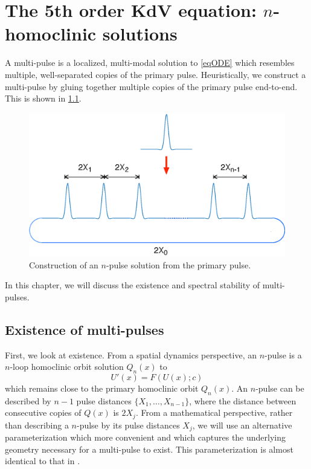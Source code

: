 \documentclass[thesis.tex]{subfiles}
\begin{document}
\iffulldocument\else
	\chapter{The 5th order KdV equation: $n$-homoclinic solutions}
\fi

A multi-pulse is a localized, multi-modal solution to \cref{eqODE} which resembles multiple, well-separated copies of the primary pulse. Heuristically, we construct a multi-pulse by gluing together multiple copies of the primary pulse end-to-end. This is shown in \cref{fig:multipulse}.
\begin{figure}
\begin{center}
\includegraphics[width=12cm]{images/kdv5numerics/multipulseperiodic.eps}
\end{center}
\caption[Construction of an $n$-pulse solution]{Construction of an $n$-pulse solution from the primary pulse.}
\label{fig:multipulse}
\end{figure}
In this chapter, we will discuss the existence and spectral stability of multi-pulses.

\section{Existence of multi-pulses}\label{sec:multiexistR}

First, we look at existence. From a spatial dynamics perspective, an $n$-pulse is a $n$-loop homoclinic orbit solution $Q_n(x)$ to
\begin{equation}\label{existgenODE1}
U'(x) = F(U(x); c)
\end{equation}
which remains close to the primary homoclinic orbit $Q_n(x)$. An $n$-pulse can be described by $n-1$ pulse distances $\{X_1, \dots, X_{n-1} \}$, where the distance between consecutive copies of $Q(x)$ is $2 X_j$. From a mathematical perspective, rather than describing a $n$-pulse by its pulse distances $X_j$, we will use an alternative parameterization which more convenient and which captures the underlying geometry necessary for a multi-pulse to exist. This parameterization is almost identical to that in \cite{SandstedeStrut,Sandstede1998}.
\end{document}
